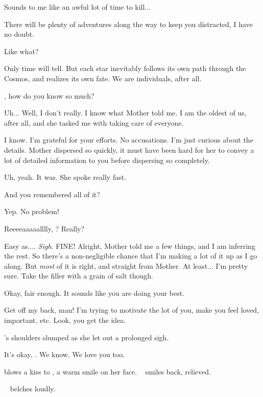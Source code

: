 \documentclass[main.tex]{subfiles}
\begin{document}
\newpara \Celaeno Sounds to me like an awful lot of time to kill...

\newpara \Maia There will be plenty of adventures along the way to keep you distracted, I have no doubt.

\newpara \Sterope  Like what?  

\newpara \Maia Only time will tell.  But each star inevitably follows its own path through the Cosmos, and realizes its own fate.  We are individuals, after all. 

\newpara \Sterope \rmmaia, how do you know so much?

\newpara \Maia Uh... Well, I don't really. I know what Mother told me.  I am the oldest of us, after all, and she tasked me with taking care of everyone.  

\newpara \Sterope I know.  I'm grateful for your efforts.  No accusations.  I'm just curious about the details.  Mother dispersed so quickly, it must have been hard for her to convey a lot of detailed information to you before dispersing so completely.

\newpara \Maia Uh, yeah.  It was.  She spoke really fast.

\newpara \Sterope And you remembered all of it?

\newpara \Maia Yep.  No problem!  

\newpara \Sterope Reeeeaaaaalllly, \rmmaia?  Really?

\newpara \Maia Easy as.... \textit{Sigh}.  FINE!  Alright, Mother told me a few things, and I am inferring the rest.  So there's a non-negligible chance that I'm making a lot of it up as I go along.  But \textit{most} of it is right, and straight from Mother.  At least... I'm pretty sure.  Take the filler with a grain of salt though.  

\newpara \Sterope Okay, fair enough.  It sounds like you are doing your best.

\newpara \Maia Get off my back, man!  I'm trying to motivate the lot of you, make you feel loved, important, etc.  Look, you get the idea. 

\newpara \nar \rmmaia's shoulders slumped as she let out a prolonged sigh.

\newpara \Sterope It's okay, \rmmaia.  We know.  We love you too.

\newpara \nar \rmsterope blows a kiss to \rmmaia, a warm smile on her face.  \rmmaia~ smiles back, relieved.

\newpara \nar \rmalcyone~ belches loudly.
\end{document}
